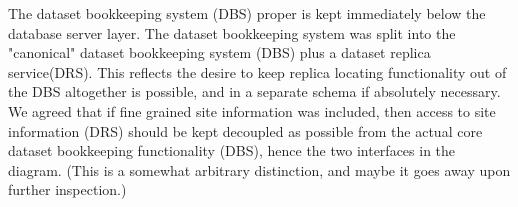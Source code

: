 \documentclass{cmspaper}
\begin{document}
The dataset bookkeeping system (DBS) proper is kept immediately below the database 
server layer.  The dataset bookkeeping system was split into the "canonical" dataset 
bookkeeping system (DBS) plus a dataset replica service(DRS).  This reflects the 
desire to keep replica locating functionality out of the DBS altogether is possible, 
and in a separate schema if absolutely necessary.    We agreed that if fine grained 
site information was included, then access to site information (DRS) should be kept 
decoupled as possible from the actual core dataset bookkeeping functionality (DBS), 
hence the two interfaces in the diagram.  (This is a somewhat arbitrary distinction, 
and maybe it goes away upon further inspection.)

\begin{figure}[hbtp]
  \begin{center}
    \caption{}
    \label{fig:ex3}
  \end{center}
\end{figure}
\end{document}
